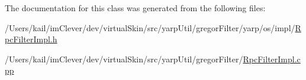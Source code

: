 The documentation for this class was generated from the following files:\begin{DoxyCompactItemize}
\item 
/Users/kail/imClever/dev/virtualSkin/src/yarpUtil/gregorFilter/yarp/os/impl/\hyperlink{_rpc_filter_impl_8h}{RpcFilterImpl.h}\item 
/Users/kail/imClever/dev/virtualSkin/src/yarpUtil/gregorFilter/\hyperlink{_rpc_filter_impl_8cpp}{RpcFilterImpl.cpp}\end{DoxyCompactItemize}
